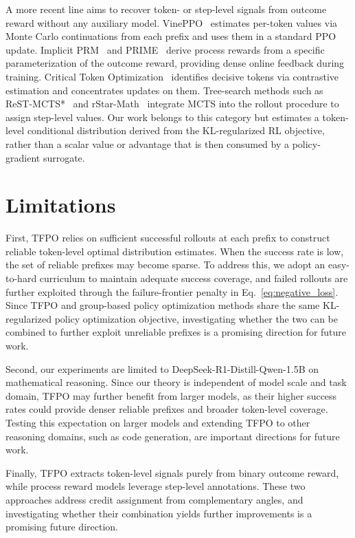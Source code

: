 \documentclass{article}
\begin{document}
A more recent line aims to recover token- or step-level signals from outcome reward without any auxiliary model. VinePPO~\citep{kazemnejad2025vinepporefiningcreditassignment} estimates per-token values via Monte Carlo continuations from each prefix and uses them in a standard PPO update. Implicit PRM~\citep{yuan2024freeprocessrewardsprocess} and PRIME~\citep{cui2025processreinforcementimplicitrewards} derive process rewards from a specific parameterization of the outcome reward, providing dense online feedback during training. Critical Token Optimization~\citep{lin2025critical} identifies decisive tokens via contrastive estimation and concentrates updates on them. Tree-search methods such as ReST-MCTS*~\citep{zhang2024rest} and rStar-Math~\citep{guan2025rstarmathsmallllmsmaster} integrate MCTS into the rollout procedure to assign step-level values. Our work belongs to this category but estimates a token-level conditional distribution derived from the KL-regularized RL objective, rather than a scalar value or advantage that is then consumed by a policy-gradient surrogate.

\section{Limitations}
First, TFPO relies on sufficient successful rollouts at each prefix to construct reliable token-level optimal distribution estimates. When the success rate is low, the set of reliable prefixes may become sparse. To address this, we adopt an easy-to-hard curriculum to maintain adequate success coverage, and failed rollouts are further exploited through the failure-frontier penalty in Eq.~\eqref{eq:negative_loss}. Since TFPO and group-based policy optimization methods share the same KL-regularized policy optimization objective, investigating whether the two can be combined to further exploit unreliable prefixes is a promising direction for future work. 

Second, our experiments are limited to DeepSeek-R1-Distill-Qwen-1.5B on mathematical reasoning. Since our theory is independent of model scale and task domain, TFPO may further benefit from larger models, as their higher success rates could provide denser reliable prefixes and broader token-level coverage. Testing this expectation on larger models and extending TFPO to other reasoning domains, such as code generation, are important directions for future work.

Finally, TFPO extracts token-level signals purely from binary outcome reward, while process reward models leverage step-level annotations. These two approaches address credit assignment from complementary angles, and investigating whether their combination yields further improvements is a promising future direction.
\end{document}
